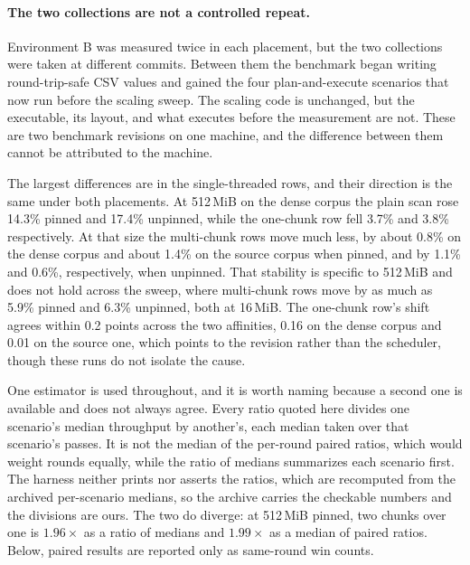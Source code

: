 \documentclass[11pt,a4paper]{article}
\theoremstyle{definition}
\theoremstyle{plain}
\begin{document}
\paragraph{The two collections are not a controlled repeat.} Environment B was measured twice in each placement, but the
two collections were taken at different commits. Between them the benchmark began writing round-trip-safe CSV values and
gained the four plan-and-execute scenarios that now run before the scaling sweep. The scaling code is unchanged, but the
executable, its layout, and what executes before the measurement are not. These are two benchmark revisions on one
machine, and the difference between them cannot be attributed to the machine.

The largest differences are in the single-threaded rows, and their direction is the same under both placements. At
512\,MiB on the dense corpus the plain scan rose 14.3\% pinned and 17.4\% unpinned, while the one-chunk row fell 3.7\%
and 3.8\% respectively. At that size the multi-chunk rows move much less, by about 0.8\% on the dense corpus and about
1.4\% on the source corpus when pinned, and by 1.1\% and 0.6\%, respectively, when unpinned. That stability is specific
to 512\,MiB and does not hold across the sweep, where multi-chunk rows move by as much as 5.9\% pinned and 6.3\%
unpinned, both at 16\,MiB. The one-chunk row's shift agrees within 0.2 points across the two affinities, 0.16 on the
dense corpus and 0.01 on the source one, which points to the revision rather than the scheduler, though these runs do
not isolate the cause.

One estimator is used throughout, and it is worth naming because a second one is available and does not always agree.
Every ratio quoted here divides one scenario's median throughput by another's, each median taken over that scenario's
passes. It is not the median of the per-round paired ratios, which would weight rounds equally, while the ratio of
medians summarizes each scenario first. The harness neither prints nor asserts the ratios, which are recomputed from the
archived per-scenario medians, so the archive carries the checkable numbers and the divisions are ours. The two do
diverge: at 512\,MiB pinned, two chunks over one is $1.96\times$ as a ratio of medians and $1.99\times$ as a median of
paired ratios. Below, paired results are reported only as same-round win counts.
\end{document}
